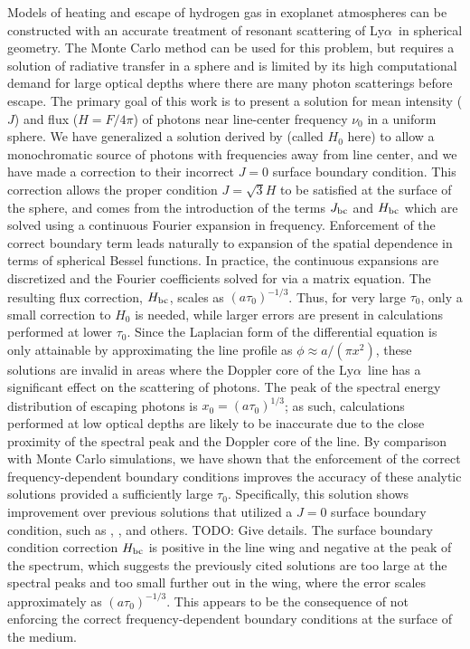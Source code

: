 \documentclass{aastex63}
\newcommand\lya{Ly$\alpha$\ }
\begin{document}
Models of heating and escape of hydrogen gas in exoplanet atmospheres can be constructed with an accurate treatment of resonant scattering of \lya in spherical geometry. The Monte Carlo method can be used for this problem, but requires a solution of radiative transfer in a sphere and is limited by its high computational demand for large optical depths where there are many photon scatterings before escape. The primary goal of this work is to present a solution for mean intensity ($J$) and flux ($H = F/4\pi$) of photons near line-center frequency $\nu_0$ in a uniform sphere. We have generalized a solution derived by \cite{2006ApJ...649...14D} (called $H_0$ here) to allow a monochromatic source of photons with frequencies away from line center, and we have made a correction to their incorrect $J=0$ surface boundary condition. This correction allows the proper condition $J=\sqrt{3}H$ to be satisfied at the surface of the sphere, and comes from the introduction of the terms $J_{\rm bc}$ and $H_{\rm bc}$ which are solved using a continuous Fourier expansion in frequency. Enforcement of the correct boundary term leads naturally to expansion of the spatial dependence in terms of spherical Bessel functions. In practice, the continuous expansions are discretized and the Fourier coefficients solved for via a matrix equation. The resulting flux correction, $H_{\rm bc}$, scales as $(a\tau_0)^{-1/3}$. Thus, for very large $\tau_0$, only a small correction to $H_0$ is needed, while larger errors are present in calculations performed at lower $\tau_0$. Since the Laplacian form of the differential equation is only attainable by approximating the line profile as $\phi \approx a/(\pi x^2)$, these solutions are invalid in areas where the Doppler core of the \lya line has a significant effect on the scattering of photons. The peak of the spectral energy distribution of escaping photons is $x_0 = (a\tau_0)^{1/3}$; as such, calculations performed at low optical depths are likely to be inaccurate due to the close proximity of the spectral peak and the Doppler core of the line. By comparison with Monte Carlo simulations, we have shown that the enforcement of the correct frequency-dependent boundary conditions improves the accuracy of these analytic solutions %
provided a sufficiently large $\tau_0$. Specifically, this solution shows improvement over previous solutions that utilized a $J=0$ surface boundary condition, such as \cite{1973MNRAS.162...43H}, \cite{1990ApJ...350..216N}, \cite{2006ApJ...649...14D} and others. TODO: Give details. The surface boundary condition correction $H_{\rm bc}$ is positive in the line wing and negative at the peak of the spectrum, which suggests the previously cited solutions are too large at the spectral peaks and too small further out in the wing, where the error scales approximately as $(a\tau_0)^{-1/3}$. This appears to be the consequence of not enforcing the correct frequency-dependent boundary conditions at the surface of the medium.
\end{document}
